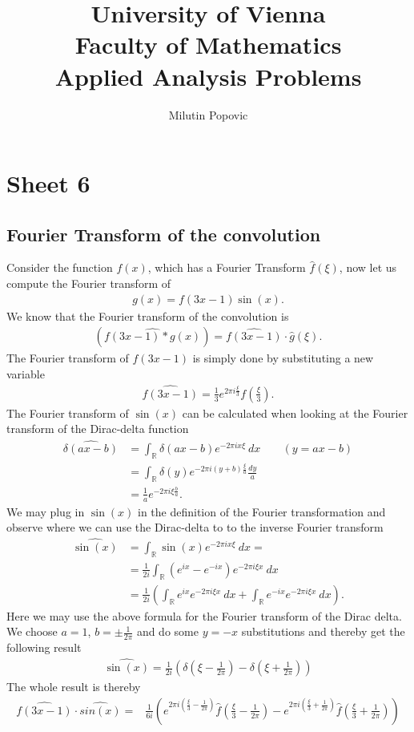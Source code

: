 \documentclass[a4paper]{article}
\title{University of Vienna\\ Faculty of Mathematics\\
\vspace{1cm}Applied Analysis Problems
}
\author{Milutin Popovic}
\begin{document}
\maketitle
\tableofcontents

\section{Sheet 6}
\subsection{Fourier Transform of the convolution}
Consider the function $f(x)$, which has a Fourier Transform $\hat{f}(\xi)$,
now let us compute the Fourier transform of
\begin{align}
    g(x) = f(3x-1) \sin(x).
\end{align}
We know that the Fourier transform of the convolution is
\begin{align}
    (\widehat{f(3x-1)*g(x)}) = \widehat{f(3x-1)} \cdot \hat{g}(\xi).
\end{align}
The Fourier transform of $f(3x-1)$ is simply done by substituting a new
variable
\begin{align}
    \widehat{f(3x-1)} = \frac{1}{3}e^{2\pi i\frac{\xi}{3}} f(\frac{\xi}{3}).
\end{align}
The Fourier transform of $\sin(x)$ can be calculated when looking at the
Fourier transform of the Dirac-delta function
\begin{align}
    \widehat{\delta(ax-b)}
    &=\int_\mathbb{R} \delta(ax-b) e^{-2\pi i x \xi}\ dx
    \;\;\;\;\;\;\; (y = ax-b)\\
    &=\int_\mathbb{R} \delta(y) e^{-2\pi i (y+b)\frac{\xi}{a}}\frac{dy}{a}\\
    &=\frac{1}{a} e^{-2\pi i \xi \frac{b}{a}}.
\end{align}
We may plug in $\sin(x)$ in the definition of the Fourier transformation and
observe where we can use the Dirac-delta to to the inverse Fourier transform
\begin{align}
    \widehat{\sin(x)}
    &=\int_\mathbb{R} \sin(x)e^{-2\pi i x\xi}\ dx=\\
    &=\frac{1}{2i}\int_\mathbb{R} (e^{ix} - e^{-ix})e^{-2\pi i \xi x}\ dx\\
    &=\frac{1}{2i}\left(
        \int_\mathbb{R} e^{ix} e^{-2\pi i \xi x}\ dx+
        \int_\mathbb{R} e^{-ix} e^{-2\pi i \xi x}\ dx
        \right).
\end{align}
Here we may use the above formula for the Fourier transform of the Dirac
delta. We choose $a=1$, $b= \pm \frac{1}{2\pi}$ and do some $y=-x$
substitutions and thereby get the following result
\begin{align}
    \widehat{\sin(x)} = \frac{1}{2i} \left(
        \delta(\xi - \frac{1}{2\pi})
        -\delta(\xi + \frac{1}{2\pi})
        \right)
\end{align}
The whole result is thereby
\begin{align}
    \widehat{f(3x-1)} \cdot \widehat{sin(x)}
    =& \frac{1}{6i} \left(
        e^{2\pi
        i(\frac{\xi}{3}-\frac{1}{2\pi})}\hat{f}(\frac{\xi}{3}-\frac{1}{2\pi})-
        e^{2\pi i(\frac{\xi}{3}+\frac{1}{2\pi})}\hat{f}(\frac{\xi}{3}+\frac{1}{2\pi})
        \right)
\end{align}
\end{document}
